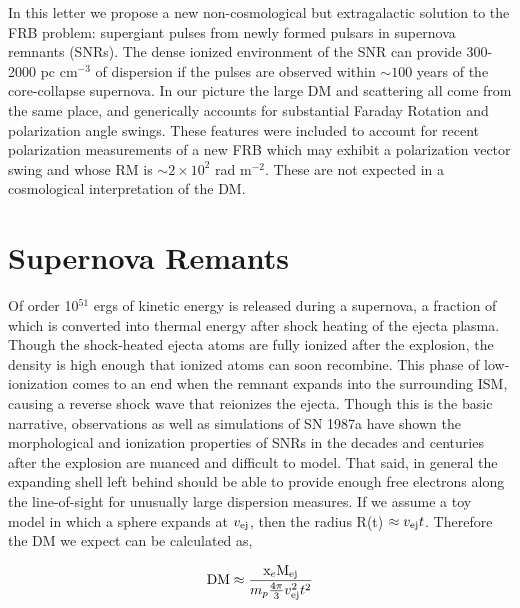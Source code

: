 \documentclass[useAMS,usenatbib]{mn2e}
\begin{document}
In this letter we propose a new non-cosmological but extragalactic
solution to the FRB problem: supergiant pulses from newly formed pulsars in 
supernova remnants (SNRs). The dense ionized environment of the SNR
can provide 300-2000 pc cm$^{-3}$ of dispersion if the pulses are observed 
within $\sim100$ years of the core-collapse supernova. In our picture the 
large DM and scattering all come from the same place, and generically
accounts for substantial Faraday Rotation and polarization angle
swings. These features were included to account for recent
polarization measurements of a new FRB \citep{2015arXiv151200529M}
which may exhibit a polarization vector swing and whose RM is $\sim2\times10^2$ rad m$^{-2}$.
These are not expected in a cosmological interpretation of the DM.


\section{Supernova Remants}
Of order 10$^{51}$ ergs of kinetic energy is released during a supernova, a 
fraction of which is converted into thermal 
energy after shock heating of the 
ejecta plasma. Though the shock-heated ejecta atoms 
are fully ionized after the explosion, the density is high enough that
ionized atoms can soon recombine.
This phase of low-ionization comes to an end when the remnant expands 
into the surrounding ISM, causing a reverse shock wave that reionizes the ejecta.
Though this is the basic narrative, observations \citep{2014ApJ...796...82Z} 
as well as simulations \citep{2014ApJ...794..174P}
of SN 1987a have shown the morphological and ionization properties of SNRs
in the decades and centuries after the explosion are nuanced and 
difficult to model.
That said, in general the expanding shell left behind 
should be able to provide enough free electrons
along the line-of-sight for unusually large dispersion measures. If we 
assume a toy model in which a sphere expands at $v_{\rm ej}$, 
then the radius R(t) $\approx v_{\rm ej} t$. Therefore the DM we expect can be 
calculated as,

\begin{equation}
\textup{DM} \approx  \frac{\textup{x}_e \textup{M}_{\rm ej}}{m_p \frac{4\pi}{3} v_{\rm ej}^2 t^2}
\end{equation}
\end{document}
